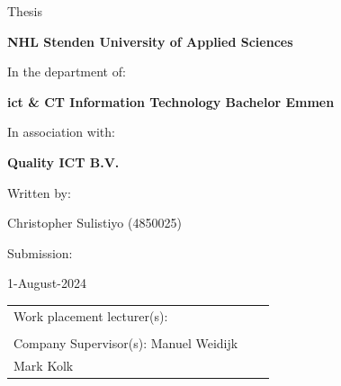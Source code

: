\begin{center}
    \vspace{0.5cm}
    \large{Thesis}
    \vspace{0.5cm}

    \textbf{NHL Stenden University of Applied Sciences}

    \vspace{0.5cm}

    In the department of:

    \vspace{0.5cm}

    \textbf{\acrshort{ict} \& CT Information Technology Bachelor Emmen}

    \vspace{0.5cm}

    In association with:

    \vspace{0.5cm}

    \textbf{Quality ICT B.V.}

    \vspace{0.5cm}

    Written by: \vspace{0.5cm}

    Christopher Sulistiyo (4850025) \vspace{0.5cm}

    Submission: \vspace{0.5cm}

    1-August-2024 \vspace{0.5cm} \vspace{0.5cm}

    \vfill
\end{center}
\begin{tabular}{p{3cm}p{7cm}p{5cm} }
    Work placement lecturer(s):           \\
    \vspace{0.0cm}                        \\

    Company Supervisor(s): Manuel Weidijk \\
    Mark Kolk                             \\
\end{tabular}

\vspace{0.5cm}
\addtocounter{page}{-1}